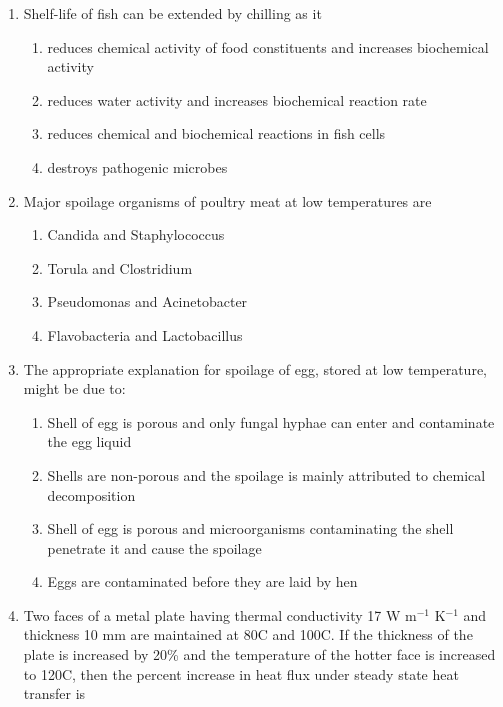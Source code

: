 \documentclass[a4paper,10pt]{article}
\begin{document}
\begin{enumerate}
\item Shelf-life of fish can be extended by chilling as it
\hfill{}

\begin{enumerate}
\item reduces chemical activity of food constituents and increases biochemical activity
\item reduces water activity and increases biochemical reaction rate
\item reduces chemical and biochemical reactions in fish cells
\item destroys pathogenic microbes
\end{enumerate}

\item Major spoilage organisms of poultry meat at low temperatures are
\hfill{}

\begin{multicols}{2}
\begin{enumerate}
\item Candida and Staphylococcus
\item Torula and Clostridium
\item Pseudomonas and Acinetobacter
\item Flavobacteria and Lactobacillus
\end{enumerate}
\end{multicols}

\item The appropriate explanation for spoilage of egg, stored at low temperature, might be due to:
\hfill{}

\begin{enumerate}
\item Shell of egg is porous and only fungal hyphae can enter and contaminate the egg liquid
\item Shells are non-porous and the spoilage is mainly attributed to chemical decomposition
\item Shell of egg is porous and microorganisms contaminating the shell penetrate it and cause the spoilage
\item Eggs are contaminated before they are laid by hen
\end{enumerate}

\item Two faces of a metal plate having thermal conductivity 17 W m$^{-1}$ K$^{-1}$ and thickness 10 mm are maintained at 80\degree C and 100\degree C. If the thickness of the plate is increased by 20\% and the temperature of the hotter face is increased to 120\degree C, then the percent increase in heat flux under steady state heat transfer is
\hfill{}


\end{enumerate}
\end{document}

